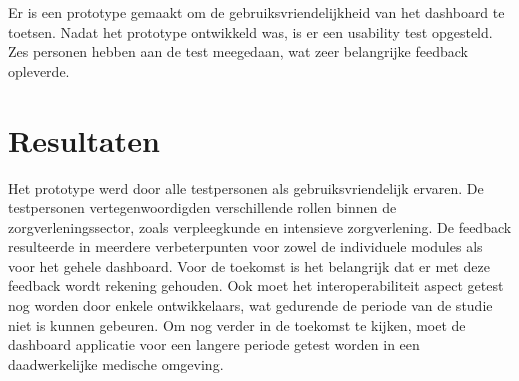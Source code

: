 \documentclass{article}
\begin{document}
Er is een prototype gemaakt om de gebruiksvriendelijkheid van het dashboard te toetsen. Nadat het prototype ontwikkeld was, is er een usability test opgesteld. Zes personen hebben aan de test meegedaan, wat zeer belangrijke feedback opleverde.

\section{Resultaten}

Het prototype werd door alle testpersonen als gebruiksvriendelijk ervaren. De testpersonen vertegenwoordigden verschillende rollen binnen de zorgverleningssector, zoals verpleegkunde en intensieve zorgverlening. De feedback resulteerde in meerdere verbeterpunten voor zowel de individuele modules als voor het gehele dashboard. Voor de toekomst is het belangrijk dat er met deze feedback wordt rekening gehouden. Ook moet het interoperabiliteit aspect getest nog worden door enkele ontwikkelaars, wat gedurende de periode van de studie niet is kunnen gebeuren. Om nog verder in de toekomst te kijken, moet de dashboard applicatie voor een langere periode getest worden in een daadwerkelijke medische omgeving.
\end{document}
